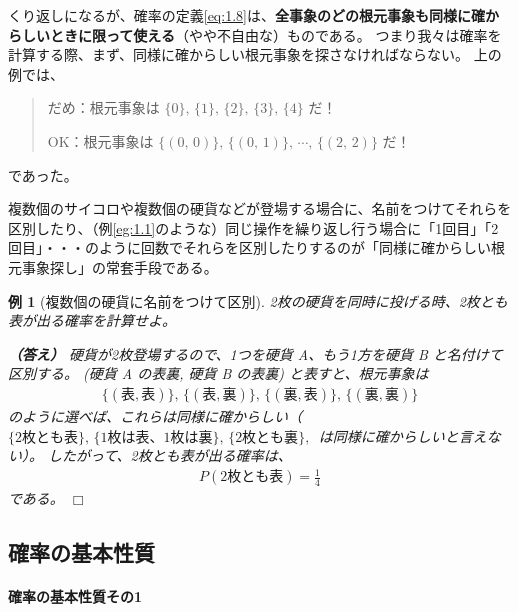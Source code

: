 \documentclass[12pt]{ltjsarticle}\usepackage{ifthen}\newcounter{enlarge}\setcounter{enlarge}{1}
\def\qed{\hfill $\Box$}
\newtheorem{eg}{例}
\begin{document}
くり返しになるが、確率の定義\eqref{eq:1.8}は、\textbf{全事象のどの根元事象も同様に確からしいときに限って使える}（やや不自由な）ものである。
つまり我々は確率を計算する際、まず、同様に確からしい根元事象を探さなければならない。
上の例では、
\begin{quotation}
  だめ：根元事象は $\{0\},\,\{1\},\,\{2\},\,\{3\},\,\{4\}$ だ！
  
  OK：根元事象は $\{(0,\, 0)\},\, \{(0,\, 1)\},\, \cdots ,\, \{(2,\,2)\}$ だ！
\end{quotation}
であった。

複数個のサイコロや複数個の硬貨などが登場する場合に、名前をつけてそれらを区別したり、（例\ref{eg:1.1}のような）同じ操作を繰り返し行う場合に「1回目」「2回目」・・・のように回数でそれらを区別したりするのが「同様に確からしい根元事象探し」の常套手段である。

\begin{eg}[複数個の硬貨に名前をつけて区別]
  2枚の硬貨を同時に投げる時、2枚とも表が出る確率を計算せよ。

  \textbf{（答え）}
  硬貨が2枚登場するので、1つを硬貨 A、もう1方を硬貨 B と名付けて区別する。
  (硬貨 A の表裏, 硬貨 B の表裏) と表すと、根元事象は
  \begin{align}
    \{(\text{表}, \text{表})\},\, \{(\text{表}, \text{裏})\},\, \{(\text{裏}, \text{表})\},\, \{(\text{裏}, \text{裏})\} \label{eq:1.11}
  \end{align}
  のように選べば、これらは同様に確からしい（$\{\text{2枚とも表}\},\, \{\text{1枚は表、1枚は裏}\},\, \{\text{2枚とも裏}\},\,$ は同様に確からしいと言えない）。
  したがって、2枚とも表が出る確率は、
  \begin{align}
    P(\text{2枚とも表}) = \frac{1}{4} \label{eq:1.12}
  \end{align}
  である。
\qed\end{eg}

\subsection{確率の基本性質}

\paragraph{確率の基本性質その1}
\end{document}
